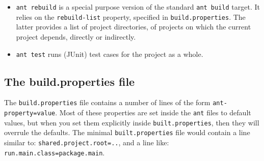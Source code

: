 \begin{itemize}


\item \verb"ant rebuild" is a special purpose version of the standard \verb"ant build" target.
It relies on the \verb"rebuild-list" property, specified in \verb"build.properties".
The latter provides a list of project directories, of projects on which the current project depends, directly or indirectly.
\item \verb"ant test" runs (JUnit) test cases for the project as a whole.
\end{itemize}


\subsection{The build.properties file}
The \verb"build.properties" file contains a number of lines of the form \verb"ant-property=value".
Most of these properties are set inside the \verb"ant" files to default values, but when you set
them explicitly  inside \verb"built.properties", then they will overrule the defaults.
The minimal \verb"built.properties" file would contain a line similar to:
\verb"shared.project.root=..",
and a line like: \verb"run.main.class=package.main".

